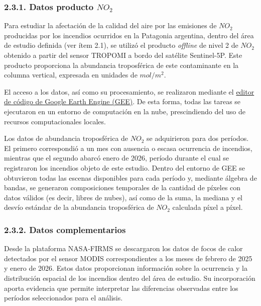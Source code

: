 \documentclass[
  spanish,
  11pt,
]{article}
\begin{document}
\subsubsection{\texorpdfstring{2.3.1. Datos producto
\(NO_{2}\)}{2.3.1. Datos producto NO\_\{2\}}}\label{datos-producto-no_2}

Para estudiar la afectación de la calidad del aire por las emisiones de
\(NO_{2}\) producidas por los incendios ocurridos en la Patagonia
argentina, dentro del área de estudio definida (ver ítem 2.1), se
utilizó el producto \emph{offline} de nivel 2 de \(NO_{2}\) obtenido a
partir del sensor TROPOMI a bordo del satélite Sentinel-5P. Este
producto proporciona la abundancia troposférica de este contaminante en
la columna vertical, expresada en unidades de \(mol/m^{2}\).

El acceso a los datos, así como su procesamiento, se realizaron mediante
el \href{https://code.earthengine.google.com/}{editor de código de
Google Earth Engine (GEE)}. De esta forma, todas las tareas se
ejecutaron en un entorno de computación en la nube, prescindiendo del
uso de recursos computacionales locales.

Los datos de abundancia troposférica de \(NO_{2}\) se adquirieron para
dos períodos. El primero correspondió a un mes con ausencia o escasa
ocurrencia de incendios, mientras que el segundo abarcó enero de 2026,
período durante el cual se registraron los incendios objeto de este
estudio. Dentro del entorno de GEE se obtuvieron todas las escenas
disponibles para cada período y, mediante álgebra de bandas, se
generaron composiciones temporales de la cantidad de píxeles con datos
válidos (es decir, libres de nubes), así como de la suma, la mediana y
el desvío estándar de la abundancia troposférica de \(NO_{2}\) calculada
píxel a píxel.

\subsubsection{2.3.2. Datos
complementarios}\label{datos-complementarios}

Desde la plataforma NASA-FIRMS se descargaron los datos de focos de
calor detectados por el sensor MODIS correspondientes a los meses de
febrero de 2025 y enero de 2026. Estos datos proporcionan información
sobre la ocurrencia y la distribución espacial de los incendios dentro
del área de estudio. Su incorporación aporta evidencia que permite
interpretar las diferencias observadas entre los períodos seleccionados
para el análisis.
\end{document}
